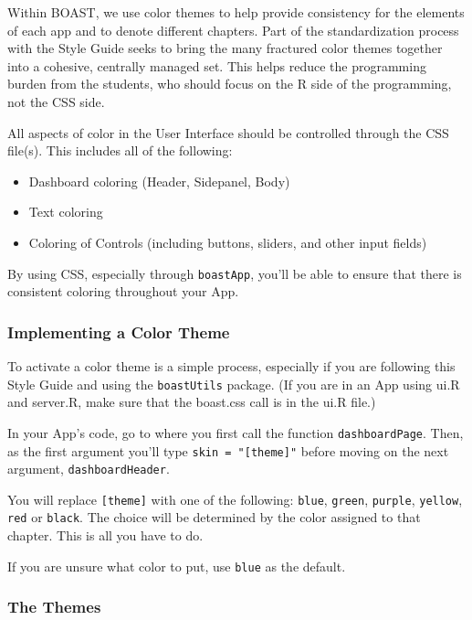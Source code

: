 \documentclass[
]{book}
\providecommand{\tightlist}{%
  \setlength{\itemsep}{0pt}\setlength{\parskip}{0pt}}
\begin{document}
Within BOAST, we use color themes to help provide consistency for the elements of each app and to denote different chapters. Part of the standardization process with the Style Guide seeks to bring the many fractured color themes together into a cohesive, centrally managed set. This helps reduce the programming burden from the students, who should focus on the R side of the programming, not the CSS side.

All aspects of color in the User Interface should be controlled through the CSS file(s). This includes all of the following:

\begin{itemize}
\tightlist
\item
  Dashboard coloring (Header, Sidepanel, Body)
\item
  Text coloring
\item
  Coloring of Controls (including buttons, sliders, and other input fields)
\end{itemize}

By using CSS, especially through \texttt{boastApp}, you'll be able to ensure that there is consistent coloring throughout your App.

\hypertarget{implementing-a-color-theme}{%
\subsubsection{Implementing a Color Theme}\label{implementing-a-color-theme}}

To activate a color theme is a simple process, especially if you are following this Style Guide and using the \texttt{boastUtils} package. (If you are in an App using ui.R and server.R, make sure that the boast.css call is in the ui.R file.)

In your App's code, go to where you first call the function \texttt{dashboardPage}. Then, as the first argument you'll type \texttt{skin\ =\ "{[}theme{]}"} before moving on the next argument, \texttt{dashboardHeader}.

You will replace \texttt{{[}theme{]}} with one of the following: \texttt{blue}, \texttt{green}, \texttt{purple}, \texttt{yellow}, \texttt{red} or \texttt{black}. The choice will be determined by the color assigned to that chapter. This is all you have to do.

If you are unsure what color to put, use \texttt{blue} as the default.

\hypertarget{the-themes}{%
\subsubsection{The Themes}\label{the-themes}}
\end{document}
